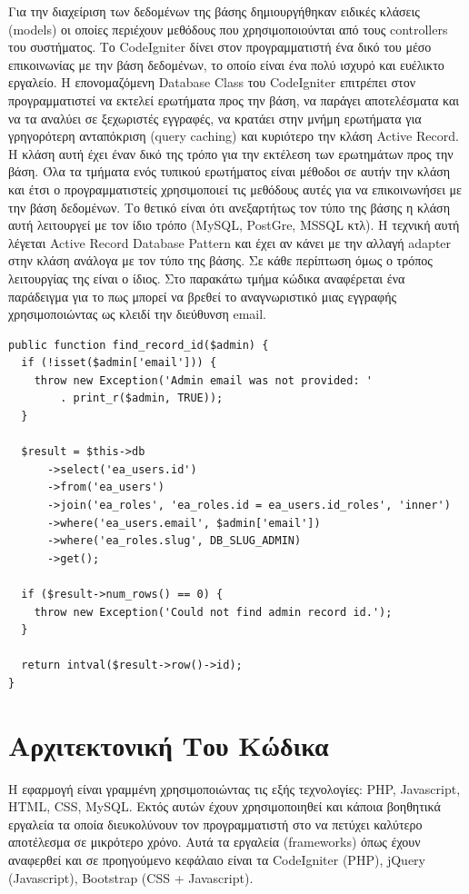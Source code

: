 Για την διαχείριση των δεδομένων της βάσης δημιουργήθηκαν ειδικές κλάσεις (models) οι οποίες περιέχουν μεθόδους που χρησιμοποιούνται από τους controllers του συστήματος. Το CodeIgniter δίνει στον προγραμματιστή ένα δικό του μέσο επικοινωνίας με την βάση δεδομένων, το οποίο είναι ένα πολύ ισχυρό και ευέλικτο εργαλείο. Η επονομαζόμενη Database Class του CodeIgniter επιτρέπει στον προγραμματιστεί να εκτελεί ερωτήματα προς την βάση, να παράγει αποτελέσματα και να τα αναλύει σε ξεχωριστές εγγραφές, να κρατάει στην μνήμη ερωτήματα για γρηγορότερη ανταπόκριση (query caching) και κυριότερο την κλάση Active Record. Η κλάση αυτή έχει έναν δικό της τρόπο για την εκτέλεση των ερωτημάτων προς την βάση. Όλα τα τμήματα ενός τυπικού ερωτήματος είναι μέθοδοι σε αυτήν την κλάση και έτσι ο προγραμματιστείς χρησιμοποιεί τις μεθόδους αυτές για να επικοινωνήσει με την βάση δεδομένων. Το θετικό είναι ότι ανεξαρτήτως τον τύπο της βάσης η κλάση αυτή λειτουργεί με τον ίδιο τρόπο (MySQL, PostGre, MSSQL κτλ). Η τεχνική αυτή λέγεται Active Record Database Pattern και έχει αν κάνει με την αλλαγή adapter στην κλάση ανάλογα με τον τύπο της βάσης. Σε κάθε περίπτωση όμως ο τρόπος λειτουργίας της είναι ο ίδιος. Στο παρακάτω τμήμα κώδικα αναφέρεται ένα παράδειγμα για το πως μπορεί να βρεθεί το αναγνωριστικό μιας εγγραφής χρησιμοποιώντας ως κλειδί την διεύθυνση email.

\begin{verbatim}
public function find_record_id($admin) {
  if (!isset($admin['email'])) {
    throw new Exception('Admin email was not provided: ' 
	    . print_r($admin, TRUE));
  }
	
  $result = $this->db
      ->select('ea_users.id')
      ->from('ea_users')
      ->join('ea_roles', 'ea_roles.id = ea_users.id_roles', 'inner')
      ->where('ea_users.email', $admin['email'])
      ->where('ea_roles.slug', DB_SLUG_ADMIN)
      ->get();
	
  if ($result->num_rows() == 0) {
    throw new Exception('Could not find admin record id.');
  }
	
  return intval($result->row()->id);
}
\end{verbatim}

\section{Αρχιτεκτονική Του Κώδικα}
Η εφαρμογή είναι γραμμένη χρησιμοποιώντας τις εξής τεχνολογίες: PHP, Javascript, HTML, CSS, MySQL. Εκτός αυτών έχουν χρησιμοποιηθεί και κάποια βοηθητικά εργαλεία τα οποία διευκολύνουν τον προγραμματιστή στο να πετύχει καλύτερο αποτέλεσμα σε μικρότερο χρόνο. Αυτά τα εργαλεία (frameworks) όπως έχουν αναφερθεί και σε προηγούμενο κεφάλαιο είναι τα CodeIgniter (PHP), jQuery (Javascript), Bootstrap (CSS + Javascript). 

